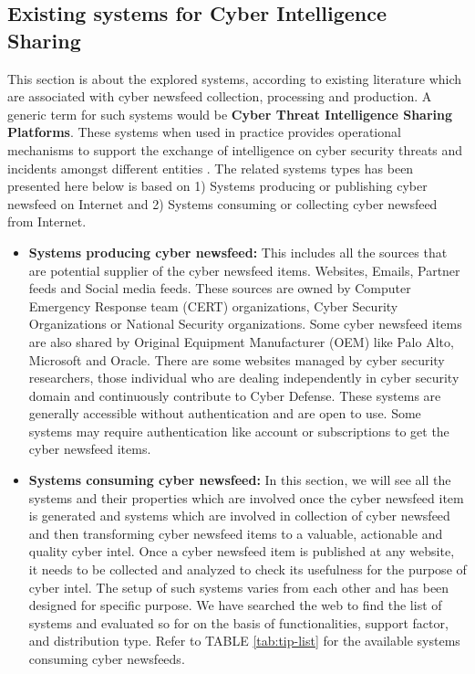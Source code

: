 \subsection{Existing systems for Cyber Intelligence Sharing}\label{Existing systems}
This section is about the explored systems, according to existing literature which are associated with cyber newsfeed collection, processing and production. 
A generic term for such systems would be \textbf{Cyber Threat Intelligence Sharing Platforms}.
These systems when used in practice provides operational mechanisms to support the exchange of intelligence on cyber security threats and incidents amongst different entities \citep{brown2015cyber,sauerwein2018shadow}.  The related systems types has been presented here below is based on 1) Systems producing or publishing cyber newsfeed on Internet and 2) Systems consuming or collecting cyber newsfeed from Internet.

\begin{itemize}
    \item \textbf{Systems producing cyber newsfeed:} 
    This includes all the sources that are potential supplier of the cyber newsfeed items. 
    Websites, Emails, Partner feeds and Social media feeds. These sources are owned by Computer Emergency Response team (CERT) organizations, Cyber Security Organizations or National Security organizations. 
    Some cyber newsfeed items are also shared by Original Equipment Manufacturer (OEM) like Palo Alto, Microsoft and Oracle. 
    There are some websites managed by cyber security researchers, those individual who are dealing independently in cyber security domain and continuously contribute to Cyber Defense. 
    These systems are generally accessible without authentication and are open to use. 
    Some systems may require authentication like account or subscriptions to get the cyber newsfeed items. 

    \item \textbf{Systems consuming cyber newsfeed:} 
    In this section, we will see all the systems and their properties which are involved once the cyber newsfeed item is generated and systems which are involved in collection of cyber newsfeed and then transforming cyber newsfeed items to a valuable, actionable and quality cyber intel. 
    Once a cyber newsfeed item is published at any website, it needs to be collected and analyzed to check its usefulness for the purpose of cyber intel.
    The setup of such systems varies from each other and has been designed for specific purpose.
    We have searched the web to find the list of systems and evaluated so for on the basis of functionalities, support factor, and distribution type. Refer to TABLE \ref{tab:tip-list} for the available systems consuming cyber newsfeeds.

 
\end{itemize}

